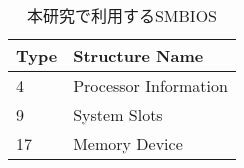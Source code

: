 \begin{table}[H]
	\begin{center}
    \caption{本研究で利用するSMBIOS}
    \label{tb-smbios}
    	\begin{tabular}{l|l}
		Type & Structure Name \\ \hline\hline
        4 & Processor Information \\ \hline
        9 & System Slots \\ \hline
        17 & Memory Device \\
		\end{tabular}
	\end{center}
\end{table}
